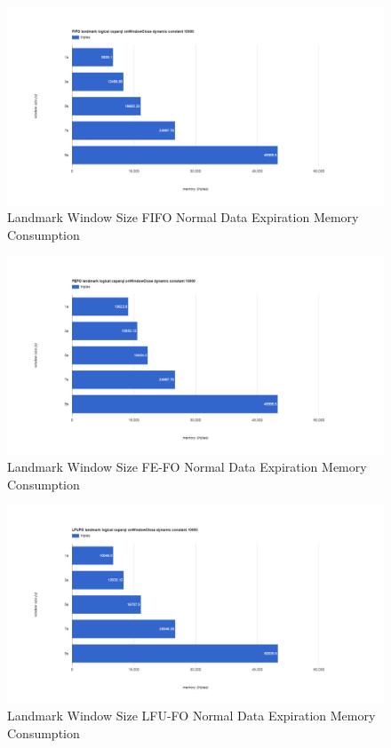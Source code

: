 \begin{figure}[!htbp]
	\centering
    \includegraphics[width=\textwidth]{img/app3-land-ws-fifo-normal-m.png}
    \caption{Landmark Window Size FIFO Normal Data Expiration Memory Consumption}
\end{figure}
\begin{figure}[!htbp]
	\centering
    \includegraphics[width=\textwidth]{img/app3-land-ws-fefo-normal-m.png}
    \caption{Landmark Window Size FE-FO Normal Data Expiration Memory Consumption}
\end{figure}
\begin{figure}[!htbp]
	\centering
    \includegraphics[width=\textwidth]{img/app3-land-ws-lfufo-normal-m.png}
    \caption{Landmark Window Size LFU-FO Normal Data Expiration Memory Consumption}
\end{figure}
